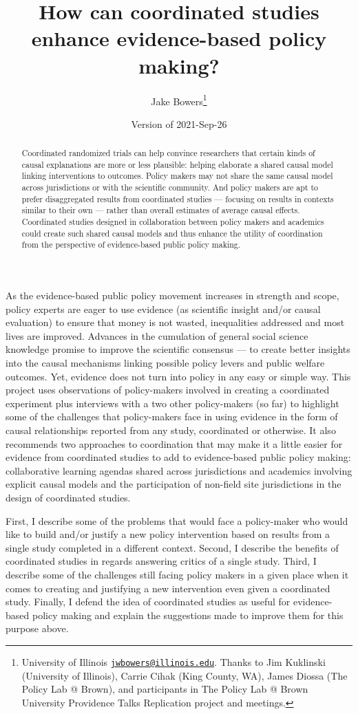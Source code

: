 \documentclass[
  11pt,
]{article}
\title{How can coordinated studies enhance evidence-based policy
making?}
\author{Jake Bowers\footnote{University of Illinois
  \href{mailto:jwbowers@illinois.edu}{\nolinkurl{jwbowers@illinois.edu}}.
  Thanks to Jim Kuklinski (University of Illinois), Carrie Cihak (King
  County, WA), James Diossa (The Policy Lab @ Brown), and participants
  in The Policy Lab @ Brown University Providence Talks Replication
  project and meetings.}}
\date{Version of 2021-Sep-26}
\begin{document}
\maketitle

\begin{abstract}

Coordinated randomized trials can help convince researchers that certain kinds
of causal explanations are more or less plausible: helping elaborate a shared
causal model linking interventions to outcomes. Policy makers may not share the
same causal model across jurisdictions or with the scientific community. And
policy makers are apt to prefer disaggregated results from coordinated studies
--- focusing on results in contexts similar to their own --- rather than overall
estimates of average causal effects.  Coordinated studies designed in
collaboration between policy makers and academics could create such shared
causal models and thus enhance the utility of coordination from the perspective
of evidence-based public policy making.
\end{abstract}

As the evidence-based public policy movement increases in strength and
scope, policy experts are eager to use evidence (as scientific insight
and/or causal evaluation) to ensure that money is not wasted,
inequalities addressed and most lives are improved. Advances in the
cumulation of general social science knowledge promise to improve the
scientific consensus --- to create better insights into the causal
mechanisms linking possible policy levers and public welfare outcomes.
Yet, evidence does not turn into policy in any easy or simple way. This
project uses observations of policy-makers involved in creating a
coordinated experiment plus interviews with a two other policy-makers
(so far) to highlight some of the challenges that policy-makers face in
using evidence in the form of causal relationships reported from any
study, coordinated or otherwise. It also recommends two approaches to
coordination that may make it a little easier for evidence from
coordinated studies to add to evidence-based public policy making:
collaborative learning agendas shared across jurisdictions and academics
involving explicit causal models and the participation of non-field site
jurisdictions in the design of coordinated studies.

First, I describe some of the problems that would face a policy-maker
who would like to build and/or justify a new policy intervention based
on results from a single study completed in a different context. Second,
I describe the benefits of coordinated studies in regards answering
critics of a single study. Third, I describe some of the challenges
still facing policy makers in a given place when it comes to creating
and justifying a new intervention even given a coordinated study.
Finally, I defend the idea of coordinated studies as useful for
evidence-based policy making and explain the suggestions made to improve
them for this purpose above.
\end{document}
